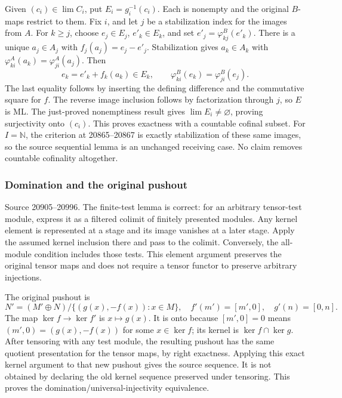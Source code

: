 Given \((c_i)\in\lim C_i\), put \(E_i=g_i^{-1}(c_i)\). Each is nonempty and the original \(B\)-maps restrict to them. Fix \(i\), and let \(j\) be a stabilization index for the images from \(A\). For \(k\geq j\), choose \(e_j\in E_j\), \(e'_k\in E_k\), and set \(e'_j=\varphi^B_{kj}(e'_k)\). There is a unique \(a_j\in A_j\) with \(f_j(a_j)=e_j-e'_j\). Stabilization gives \(a_k\in A_k\) with \(\varphi^A_{ki}(a_k)=\varphi^A_{ji}(a_j)\). Then \[
e_k=e'_k+f_k(a_k)\in E_k,
\qquad
\varphi^B_{ki}(e_k)=\varphi^B_{ji}(e_j).
\] The last equality follows by inserting the defining difference and the commutative square for \(f\). The reverse image inclusion follows by factorization through \(j\), so \(E\) is ML. The just-proved nonemptiness result gives \(\lim E_i\ne\varnothing\), proving surjectivity onto \((c_i)\). This proves exactness with a countable cofinal subset. For \(I=\mathbb N\), the criterion at 20865--20867 is exactly stabilization of these same images, so the source sequential lemma is an unchanged receiving case. No claim removes countable cofinality altogether.

\subsubsection{Domination and the original pushout}\label{domination-and-the-original-pushout}

Source 20905--20996. The finite-test lemma is correct: for an arbitrary tensor-test module, express it as a filtered colimit of finitely presented modules. Any kernel element is represented at a stage and its image vanishes at a later stage. Apply the assumed kernel inclusion there and pass to the colimit. Conversely, the all-module condition includes those tests. This element argument preserves the original tensor maps and does not require a tensor functor to preserve arbitrary injections.

The original pushout is \[
N'=(M'\oplus N)/\{(g(x),-f(x)):x\in M\},
\quad f'(m')=[m',0],\quad g'(n)=[0,n].
\] The map \(\ker f\to\ker f'\) is \(x\mapsto g(x)\). It is onto because \([m',0]=0\) means \((m',0)=(g(x),-f(x))\) for some \(x\in\ker f\); its kernel is \(\ker f\cap\ker g\). After tensoring with any test module, the resulting pushout has the same quotient presentation for the tensor maps, by right exactness. Applying this exact kernel argument to that new pushout gives the source sequence. It is not obtained by declaring the old kernel sequence preserved under tensoring. This proves the domination/universal-injectivity equivalence.

